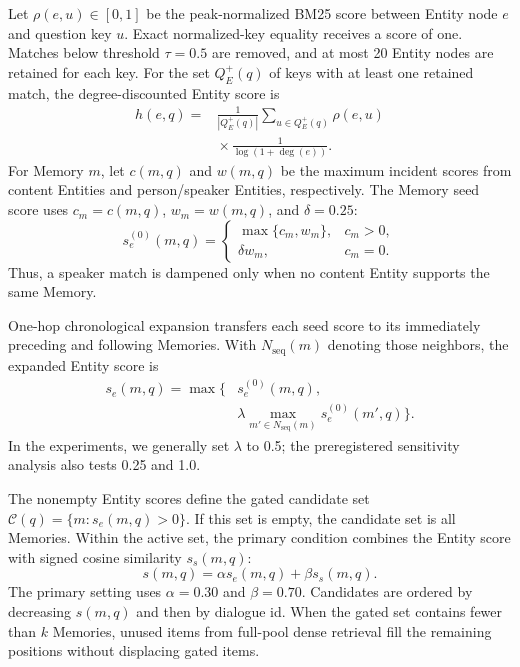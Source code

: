 \documentclass[a4paper,twoside]{article}
\begin{document}
Let \(\rho(e,u)\in[0,1]\) be the peak-normalized BM25 score between Entity
node \(e\) and question key \(u\). Exact normalized-key equality receives a
score of one. Matches below threshold \(\tau=0.5\) are removed, and at most
20 Entity nodes are retained for each key. For the set \(Q_E^+(q)\) of keys
with at least one retained match, the degree-discounted Entity score is
\begin{equation}
\begin{aligned}
h(e,q)={}&\frac{1}{|Q_E^+(q)|}
\sum_{u\in Q_E^+(q)}\rho(e,u)\\
&{}\times\frac{1}{\log(1+\deg(e))}.
\end{aligned}
\label{eq:entity}
\end{equation}
For Memory \(m\), let \(c(m,q)\) and \(w(m,q)\) be the maximum incident
scores from content Entities and person/speaker Entities, respectively. The
Memory seed score uses \(c_m=c(m,q)\), \(w_m=w(m,q)\), and \(\delta=0.25\):
\begin{equation}
s_e^{(0)}(m,q)=
\begin{cases}
\max\{c_m,w_m\}, & c_m>0,\\
\delta w_m, & c_m=0.
\end{cases}
\label{eq:seed}
\end{equation}
Thus, a speaker match is dampened only when no content Entity supports the
same Memory.

One-hop chronological expansion transfers each seed score to its immediately
preceding and following Memories. With \(N_{\mathrm{seq}}(m)\) denoting those
neighbors, the expanded Entity score is
\begin{equation}
\begin{aligned}
s_e(m,q)=\max\biggl\{&s_e^{(0)}(m,q),\\
&\lambda\max_{m'\in N_{\mathrm{seq}}(m)}s_e^{(0)}(m',q)\biggr\}.
\end{aligned}
\label{eq:sequence}
\end{equation}
In the experiments, we generally set \(\lambda\) to 0.5; the preregistered
sensitivity analysis also tests 0.25 and 1.0.

The nonempty Entity scores define the gated candidate set
\(\mathcal{C}(q)=\{m:s_e(m,q)>0\}\). If this set is empty, the candidate set
is all Memories. Within the active set, the primary condition combines the
Entity score with signed cosine similarity \(s_s(m,q)\):
\begin{equation}
s(m,q)=\alpha s_e(m,q)+\beta s_s(m,q).
\label{eq:fusion}
\end{equation}
The primary setting uses \(\alpha=0.30\) and \(\beta=0.70\).
Candidates are ordered by decreasing \(s(m,q)\) and then by dialogue id. When
the gated set contains fewer than \(k\) Memories, unused items from full-pool
dense retrieval fill the remaining positions without displacing gated items.
\end{document}
